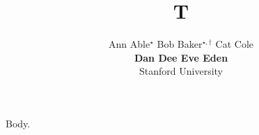 \documentclass{article}
\begin{document}
\title{T}
\author{Ann Able$^\star$ \quad Bob Baker$^{\star,\dagger}$ \quad Cat Cole \\ \textbf{Dan Dee \quad Eve Eden} \\ Stanford University}
\maketitle
Body.
\end{document}
